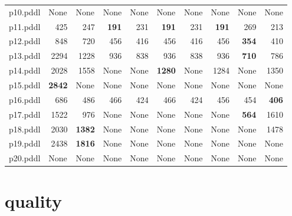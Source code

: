 \documentclass{article}
\begin{document}
\begin{tabular}{@{}lrrrrrrrrr@{}}
p10.pddl & \multicolumn{1}{|l|}{None} & \multicolumn{1}{|l|}{None} & \multicolumn{1}{|l|}{None} & \multicolumn{1}{|l|}{None} & \multicolumn{1}{|l|}{None} & \multicolumn{1}{|l|}{None} & \multicolumn{1}{|l|}{None} & \multicolumn{1}{|l|}{None} & \multicolumn{1}{|l|}{None} \\
p11.pddl & 425 & 247 & \textbf{191} & 231 & \textbf{191} & 231 & \textbf{191} & 269 & 213 \\
p12.pddl & 848 & 720 & 456 & 416 & 456 & 416 & 456 & \textbf{354} & 410 \\
p13.pddl & 2294 & 1228 & 936 & 838 & 936 & 838 & 936 & \textbf{710} & 786 \\
p14.pddl & 2028 & 1558 & \multicolumn{1}{|l|}{None} & \multicolumn{1}{|l|}{None} & \textbf{1280} & \multicolumn{1}{|l|}{None} & 1284 & \multicolumn{1}{|l|}{None} & 1350 \\
p15.pddl & \textbf{2842} & \multicolumn{1}{|l|}{None} & \multicolumn{1}{|l|}{None} & \multicolumn{1}{|l|}{None} & \multicolumn{1}{|l|}{None} & \multicolumn{1}{|l|}{None} & \multicolumn{1}{|l|}{None} & \multicolumn{1}{|l|}{None} & \multicolumn{1}{|l|}{None} \\
p16.pddl & 686 & 486 & 466 & 424 & 466 & 424 & 456 & 454 & \textbf{406} \\
p17.pddl & 1522 & 976 & \multicolumn{1}{|l|}{None} & \multicolumn{1}{|l|}{None} & \multicolumn{1}{|l|}{None} & \multicolumn{1}{|l|}{None} & \multicolumn{1}{|l|}{None} & \textbf{564} & 1610 \\
p18.pddl & 2030 & \textbf{1382} & \multicolumn{1}{|l|}{None} & \multicolumn{1}{|l|}{None} & \multicolumn{1}{|l|}{None} & \multicolumn{1}{|l|}{None} & \multicolumn{1}{|l|}{None} & \multicolumn{1}{|l|}{None} & 1478 \\
p19.pddl & 2438 & \textbf{1816} & \multicolumn{1}{|l|}{None} & \multicolumn{1}{|l|}{None} & \multicolumn{1}{|l|}{None} & \multicolumn{1}{|l|}{None} & \multicolumn{1}{|l|}{None} & \multicolumn{1}{|l|}{None} & \multicolumn{1}{|l|}{None} \\
p20.pddl & \multicolumn{1}{|l|}{None} & \multicolumn{1}{|l|}{None} & \multicolumn{1}{|l|}{None} & \multicolumn{1}{|l|}{None} & \multicolumn{1}{|l|}{None} & \multicolumn{1}{|l|}{None} & \multicolumn{1}{|l|}{None} & \multicolumn{1}{|l|}{None} & \multicolumn{1}{|l|}{None} \\
\end{tabular}

\hypertarget{quality}{}
\section*{quality}
\end{document}
